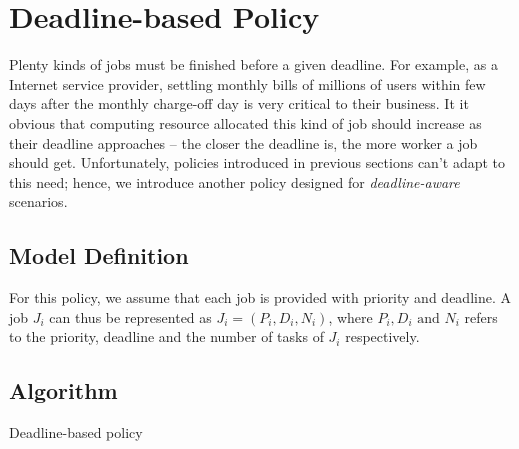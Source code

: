 \section{Deadline-based Policy}

Plenty kinds of jobs must be finished before a given deadline.
For example, as a Internet service provider, settling monthly bills of
millions of users within few days after the monthly charge-off day is
very critical to their business.
It it obvious that computing resource allocated this kind of job should
increase as their deadline approaches -- the closer the deadline is, the
more worker a job should get.
Unfortunately, policies introduced in previous sections can't adapt to
this need; hence, we introduce another policy designed for
\emph{deadline-aware} scenarios.

\subsection{Model Definition}

For this policy, we assume that each job is provided with priority and
deadline.
A job $J_i$ can thus be represented as $J_i = (P_i, D_i, N_i)$, where
$P_i, D_i\text{ and }N_i$ refers to the priority, deadline and the
number of tasks of $J_i$ respectively.


\subsection{Algorithm}

\begin{algorithm}[H]
  \DontPrintSemicolon %
  
  \caption{Deadline-based policy}
  \label{algo:deadline-based}
\end{algorithm}
